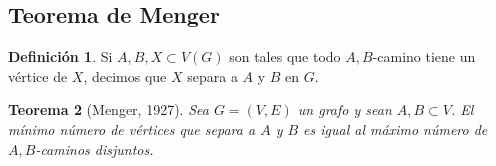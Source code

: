 \documentclass[12pt]{report}
\theoremstyle{plain}
\newtheorem{theorem}{Teorema}[section]
\theoremstyle{definition}
\newtheorem{definition}[theorem]{Definición}
\begin{document}
\subsection[]{Teorema de Menger}
\begin{definition}
Si $A,B,X \subset V(G)$ son tales que todo $A,B$-camino tiene un vértice de $X$, decimos que $X$ separa a $A$ y $B$ en $G$.
\end{definition}

\begin{theorem}[Menger, 1927]
Sea $G = (V,E)$ un grafo y sean $A,B \subset V$. El mínimo número de vértices que separa a $A$ y $B$ es igual al máximo número de $A,B$-caminos disjuntos.
\end{theorem}







\end{document}
